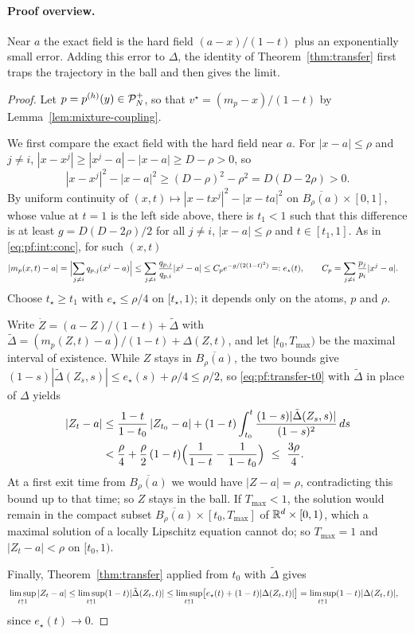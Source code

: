 \documentclass{article} %
\makeatletter
\newif\ificlr
\newcommand{\placeblock}[1]{\ificlr\@nameuse{moved@#1}\fi}
\newcommand{\iclrstart}{\begin{aligned}&}\newcommand{\iclrend}{\end{aligned}}
\newcommand{\iclrallow}{\allowbreak}
\newcommand{\iclrstart}{}\newcommand{\iclrend}{}\newcommand{\iclrallow}{}
\theoremstyle{plain}
\theoremstyle{definition}
\theoremstyle{remark}
\makeatother
\begin{document}
\label{apx:pf-localtransfer}
\ificlr\placeblock{localtransfer}\else\proplocaltransfer*\fi
\paragraph{Proof overview.} Near $a$ the exact field is the hard field $(a-x)/(1-t)$ plus an
exponentially small error. Adding this error to $\Delta$, the identity of
Theorem~\ref{thm:transfer} first traps the trajectory in the ball and then gives the limit.
\begin{proof}
Let $p=p^{(h)}(y)\in\mathcal{P}_N^{+}$, so that $v^\star=(m_p-x)/(1-t)$ by Lemma~\ref{lem:mixture-coupling}.

We first compare the exact field with the hard field near $a$. For $|x-a|\le\rho$ and $j\ne i$,
$|x-x^j|\ge|x^j-a|-|x-a|\ge D-\rho>0$, so
\[
|x-x^j|^2-|x-a|^2\ge(D-\rho)^2-\rho^2=D(D-2\rho)>0 .
\]
By uniform continuity of $(x,t)\mapsto|x-tx^j|^2-|x-ta|^2$ on $\overline{B_\rho(a)}\times[0,1]$,
whose value at $t=1$ is the left side above, there is $t_1<1$ such that this difference is at least
$g=D(D-2\rho)/2$ for all $j\ne i$, $|x-a|\le\rho$ and $t\in[t_1,1]$. As in \eqref{eq:pf:int:conc},
for such $(x,t)$
\[
\iclrstart|m_p(x,t)-a|=\Bigl|\sum_{j\ne i}q_{p,j}(x^j-a)\Bigr|\le\sum_{j\ne i}\frac{q_{p,j}}{q_{p,i}}|x^j-a|
\le C_pe^{-g/(2(1-t)^2)}=:e_\star(t),\iclrqbr C_p=\sum_{j\ne i}\frac{p_j}{p_i}|x^j-a|.\iclrend
\]
Choose $t_\star\ge t_1$ with $e_\star\le\rho/4$ on $[t_\star,1)$; it depends only on the atoms, $p$
and $\rho$.

Write $\dot Z=(a-Z)/(1-t)+\tilde\Delta$ with
$\tilde\Delta=(m_p(Z,t)-a)/(1-t)+\Delta(Z,t)$, and let $[t_0,T_{\max})$ be the maximal interval of
existence. While $Z$ stays in $\overline{B_\rho(a)}$, the two bounds give
$(1-s)|\tilde\Delta(Z_s,s)|\le e_\star(s)+\rho/4\le\rho/2$, so \eqref{eq:pf:transfer-t0} with
$\tilde\Delta$ in place of $\Delta$ yields
\begin{align*}
|Z_t-a|
&\le\frac{1-t}{1-t_0}\,|Z_{t_0}-a|+(1-t)\int_{t_0}^t\frac{(1-s)|\tilde\Delta(Z_s,s)|}{(1-s)^2}\,ds\\
&<\frac\rho4+\frac\rho2\,(1-t)\Bigl(\frac1{1-t}-\frac1{1-t_0}\Bigr)\ \le\ \frac{3\rho}4 .
\end{align*}
At a first exit time from $\overline{B_\rho(a)}$ we would have $|Z-a|=\rho$, contradicting this
bound up to that time; so $Z$ stays in the ball. If $T_{\max}<1$, the solution would remain in the
compact subset $\overline{B_\rho(a)}\times[t_0,T_{\max}]$ of $\mathbb{R}^d\times[0,1)$, which a maximal
solution of a locally Lipschitz equation cannot do; so $T_{\max}=1$ and $|Z_t-a|<\rho$ on
$[t_0,1)$.

Finally, Theorem~\ref{thm:transfer} applied from $t_0$ with $\tilde\Delta$ gives
\[
\iclrstart\limsup_{t\uparrow1}|Z_t-a|\le\limsup_{t\uparrow1}(1-t)|\tilde\Delta(Z_t,t)|
\le\limsup_{t\uparrow1}\bigl[e_\star(t)+(1-t)|\Delta(Z_t,t)|\bigr]
\iclrbrq=\limsup_{t\uparrow1}(1-t)|\Delta(Z_t,t)|,\iclrend
\]
since $e_\star(t)\to0$.
\end{proof}
\end{document}
